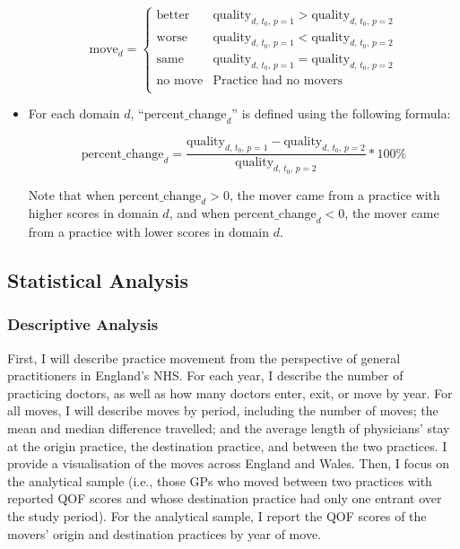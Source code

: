 \documentclass[11pt]{article}
\begin{document}
\begin{itemize}
$$
\textrm{move}_{d} = \begin{cases}
  \textrm{better} & \textrm{quality}_{d\textrm{, }t_0\textrm{, }p=1} > \textrm{quality}_{d\textrm{, }t_0\textrm{, }p=2} \\
  \textrm{worse}  & \textrm{quality}_{d\textrm{, }t_0\textrm{, }p=1} < \textrm{quality}_{d\textrm{, }t_0\textrm{, }p=2} \\
  \textrm{same}   & \textrm{quality}_{d\textrm{, }t_0\textrm{, }p=1} = \textrm{quality}_{d\textrm{, }t_0\textrm{, }p=2} \\
  \textrm{no move}   & \textrm{Practice had no movers} \\
  \end{cases}
$$



\item For each domain $d$, ``$\textrm{percent\_change}_{d}$'' is defined using the following formula:

$$
\textrm{percent\_change}_{d} = \frac{\textrm{quality}_{d\textrm{, }t_0\textrm{, }p=1} - \textrm{quality}_{d\textrm{, }t_0\textrm{, }p=2}}{\textrm{quality}_{d\textrm{, }t_0\textrm{, }p=2}} * 100\%
$$

Note that when $\textrm{percent\_change}_d > 0$, the mover came from a practice with higher scores in domain $d$, and when $\textrm{percent\_change}_d < 0$, the mover came from a practice with lower scores in domain $d$.


\end{itemize}


\subsection{Statistical Analysis}

\subsubsection{Descriptive Analysis}

First, I will describe practice movement from the perspective of general practitioners in England's NHS. For each year, I describe the number of practicing doctors, as well as how many doctors enter, exit, or move by year. For all moves, I will describe moves by period, including the number of moves; the mean and median difference travelled; and the average length of physicians' stay at the origin practice, the destination practice, and between the two practices. I provide a visualisation of the moves across England and Wales. Then, I focus on the analytical sample (i.e., those GPs who moved between two practices with reported QOF scores and whose destination practice had only one entrant over the study period). For the analytical sample, I report the QOF scores of the movers' origin and destination practices by year of move.
\end{document}
